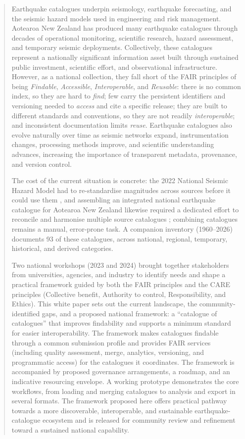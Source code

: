 \documentclass[11pt]{article}
\begin{document}
\newpage
\begin{abstract}
Earthquake catalogues underpin seismology, earthquake forecasting, and the seismic hazard models used in engineering and risk management. Aotearoa New Zealand has produced many earthquake catalogues through decades of operational monitoring, scientific research, hazard assessment, and temporary seismic deployments. Collectively, these catalogues represent a nationally significant information asset built through sustained public investment, scientific effort, and observational infrastructure. However, as a national collection, they fall short of the FAIR principles of being \emph{Findable}, \emph{Accessible}, \emph{Interoperable}, and \emph{Reusable}: there is no common index, so they are hard to \emph{find}; few carry the persistent identifiers and versioning needed to \emph{access} and cite a specific release; they are built to different standards and conventions, so they are not readily \emph{interoperable}; and inconsistent documentation limits \emph{reuse}. Earthquake catalogues also evolve naturally over time as seismic networks expand, instrumentation changes, processing methods improve, and scientific understanding advances, increasing the importance of transparent metadata, provenance, and version control.

The cost of the current situation is concrete: the 2022 National Seismic Hazard Model had to re-standardise magnitudes across sources before it could use them \citep{NSHM2022BSSA, Christophersen2024}, and assembling an integrated national earthquake catalogue for Aotearoa New Zealand likewise required a dedicated effort to reconcile and harmonise multiple source catalogues \citep{Rollins2025}; combining catalogues remains a manual, error-prone task. A companion inventory (1960--2026) documents 93 of these catalogues, across national, regional, temporary, historical, and derived categories.

Two national workshops (2023 and 2024) brought together stakeholders from universities, agencies, and industry to identify needs and shape a practical framework guided by both the FAIR principles and the CARE principles (Collective benefit, Authority to control, Responsibility, and Ethics). This white paper sets out the current landscape, the community-identified gaps, and a proposed national framework: a ``catalogue of catalogues'' that improves findability and supports a minimum standard for easier interoperability. The framework makes catalogues findable through a common submission profile and provides FAIR services (including quality assessment, merge, analytics, versioning, and programmatic access) for the catalogues it coordinates. The framework is accompanied by proposed governance arrangements, a roadmap, and an indicative resourcing envelope. A working prototype demonstrates the core workflows, from loading and merging catalogues to analysis and export in several formats. The framework proposed here offers practical pathway towards a more discoverable, interoperable, and sustainable earthquake-catalogue ecosystem and is released for community review and refinement toward a sustained national capability.
\end{abstract}
\end{document}
